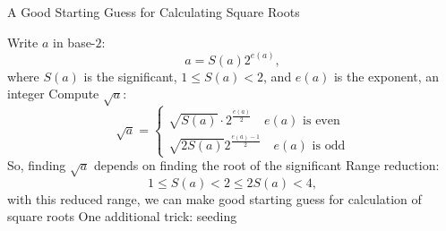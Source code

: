 \documentclass[12pt, a4paper]{article}
\begin{document}
\begin{algorithm}
	\caption{A Good Starting Guess for Calculating Square Roots}
	Write $a$ in base-$2$: \[a=S(a)2^{e(a)},\] where $S(a)$ is the significant, $1\leq S(a)<2$, and $e(a)$ is the exponent, an integer\;
	Compute $\sqrt{a}$: \[\sqrt{a}=\begin{cases}\sqrt{S(a)}\cdot2^{\frac{e(a)}{2}}\quad e(a)\text{ is even}\\\sqrt{2S(a)}2^{\frac{e(a)-1}{2}}\quad e(a)\text{ is odd}\end{cases}\] So, finding $\sqrt{a}$ depends on finding the root of the significant\;
	Range reduction: \[1\leq S(a)<2\leq2S(a)<4,\] with this reduced range, we can make good starting guess for calculation of square roots\;
	One additional trick: seeding\;
\end{algorithm}
\end{document}

